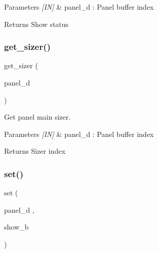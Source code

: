 \begin{DoxyParams}{Parameters}
{\em \mbox{[}\+I\+N\mbox{]}} & panel\+\_\+d \+: Panel buffer index \\
\hline
\end{DoxyParams}
\begin{DoxyReturn}{Returns}
Show status 
\end{DoxyReturn}
\mbox{\label{classpanel_a346b6978db558e41405dd5662601acca}} 
\subsubsection{get\_sizer()}
{\footnotesize\ttfamily get\+\_\+sizer (\begin{DoxyParamCaption}\item[{panel\+\_\+d}]{ }\end{DoxyParamCaption})}



Get panel main sizer. 


\begin{DoxyCode}{0}
\end{DoxyCode}



\begin{DoxyParams}{Parameters}
{\em \mbox{[}\+I\+N\mbox{]}} & panel\+\_\+d \+: Panel buffer index \\
\hline
\end{DoxyParams}
\begin{DoxyReturn}{Returns}
Sizer index 
\end{DoxyReturn}
\mbox{\label{classpanel_a4dd7a414f2ac1b03e0c849f54d396a0d}} 
\subsubsection{set()}
{\footnotesize\ttfamily set (\begin{DoxyParamCaption}\item[{panel\+\_\+d}]{,  }\item[{show\+\_\+b}]{ }\end{DoxyParamCaption})}



